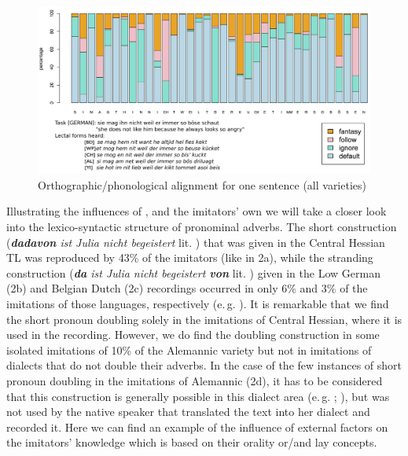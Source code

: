 \documentclass[output=paper]{LSP/langsci}
\begin{document}
\begin{figure}[t]
\centering
\includegraphics[width=\textwidth]{illustrations/schaf_etal_fig2}%
\caption{\label{alignment1}Orthographic/phonological alignment for one sentence (all varieties)}%
\end{figure}

Illustrating the influences of ,  and the imitators’ own  we will take a closer look into the lexico-syntactic structure of pronominal adverbs. The short  construction (\textit{\textbf{dadavon} ist Julia nicht begeistert}  lit. ) that was given in the Central Hessian TL was reproduced by 43\% of the imitators (like in 2a), while the stranding construction (\textit{\textbf{da} ist Julia nicht begeistert \textbf{von}} lit. ) given in the Low German (2b) and Belgian Dutch (2c) recordings occurred in only  6\% and 3\% of the imitations of those languages, respectively (e.\,g. ).  It is remarkable that we find the short pronoun doubling solely in the imitations of Central Hessian, where it is used in the recording. However, we do find the doubling construction in some isolated imitations of 10\% of the Alemannic variety but not in imitations of dialects that do not double their adverbs. In the case of the few instances of short pronoun doubling in the imitations of Alemannic (2d), it has to be considered that this construction is generally possible in this dialect area (e.\,g. \cite{fleischer_syntax_2002}; \cite[Round 1 Questions 11, 12; Round 2 Question 21]{ADA}), but was not used by the native speaker that translated the text into her dialect and recorded it. Here we can find an example of the influence of external factors on the imitators’ knowledge which is based on their orality or/and lay concepts.
\end{document}
